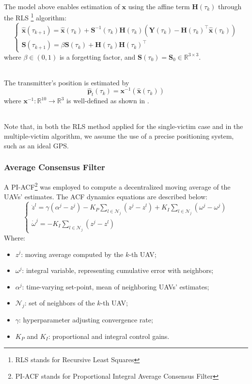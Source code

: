 \documentclass[main]{subfiles}
\begin{document}
\noindent\\
The model above enables estimation of \( \mathbf{x} \) using the affine term 
\( \mathbf{H}(\tau_k) \) through the RLS \footnote{RLS stands for Recursive Least Squares} algorithm:
\[
\begin{cases}
    \hat{\mathbf{x}}(\tau_{k+1}) = \hat{\mathbf{x}}(\tau_k) + \mathbf{S}^{-1}(\tau_k)\mathbf{H}(\tau_k) \left( \mathbf{Y}(\tau_k) - \mathbf{H}(\tau_k)^\top \hat{\mathbf{x}}(\tau_k) \right) \\
    \mathbf{S}(\tau_{k+1}) = \beta \mathbf{S}(\tau_k) + \mathbf{H}(\tau_k)\mathbf{H}(\tau_k)^\top
\end{cases}
\]
where \( \beta \in (0, 1) \) is a forgetting factor, and \( \mathbf{S}(\tau_0) = \mathbf{S}_0 \in \mathbb{R}^{3 \times 3} \). 

\noindent\\
The transmitter's position is estimated by
\begin{equation}
    \hat{\mathbf{p}}_t(\tau_k) = \mathbf{x}^{-1}(\hat{\mathbf{x}}(\tau_k))
    \label{eq:mapping}
\end{equation}
where \( \mathbf{x}^{-1} : \mathbb{R}^{10} \rightarrow \mathbb{R}^3 \) is well-defined as shown in \cite{similar-main}. 

\noindent\\
Note that, in both the RLS method applied for the single-victim case and in the multiple-victim algorithm, 
we assume the use of a precise positioning system, such as an ideal GPS.

\subsubsection{Average Consensus Filter}
A PI-ACF\footnote{PI-ACF stands for Proportional Integral Average Consensus Filter} was employed to compute 
a decentralized moving average of the UAVs' estimates. 
The ACF dynamics equations are described below:
\[
\begin{cases}
    \dot{z}^l = \gamma(\alpha^j - z^j) - K_P \sum_{l \in \mathcal{N}_j} (z^j - z^l) + K_I \sum_{l \in \mathcal{N}_j} (\omega^j - \omega^j) \\
    \dot{\omega}^j = - K_I \sum_{l \in \mathcal{N}_j} (z^j - z^l)
\end{cases}
\]
Where:
\begin{itemize}
    \item \( z^j \): moving average computed by the \( k \)-th UAV;
    \item \( \omega^j \): integral variable, representing cumulative error 
    with neighbors;
    \item \( \alpha^j \): time-varying set-point, mean of neighboring UAVs' estimates;
    \item \( \mathcal{N}_j \): set of neighbors of the \( k \)-th UAV;
    \item \( \gamma \): hyperparameter adjusting convergence rate;
    \item \( K_P \) and \( K_I \): proportional and integral control gains.
\end{itemize}
\end{document}
